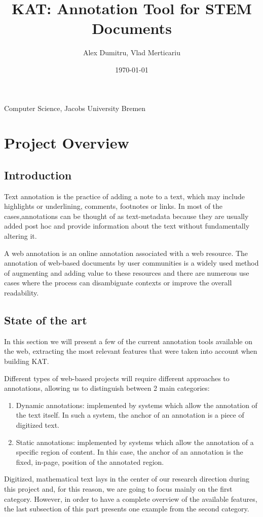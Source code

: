 \documentclass[a4paper, 12pt, notitlepage]{report}
\title{KAT: Annotation Tool for STEM Documents} %
\author{Alex Dumitru, Vlad Merticariu} %
\date{\today} %
\begin{document}
\maketitle
\begin{center}
Computer Science,  Jacobs University Bremen %
\\[12pt]
\end{center}
\thispagestyle{empty}
\newpage

\tableofcontents 



\chapter{Project Overview}
%

\section{Introduction}\label{sec:intro}
Text annotation is the practice of adding a note to a text, which may include highlights
or underlining, comments, footnotes or links.  In most of the cases,annotations can be
thought of as text-metadata because they are usually added post hoc and provide
information about the text without fundamentally altering it.

A web annotation is an online annotation associated with a web resource. The annotation of
web-based documents by user communities is a widely used method of augmenting and adding
value to these resources and there are numerous use cases where the process can
disambiguate contexts or improve the overall readability.
\section{State of the art}
In this section we will present a few of the current annotation tools available on the web, extracting the most relevant features that were taken into account when building KAT.

Different types of web-based projects will 
require different approaches to annotations, allowing us to distinguish between 2 main categories:
\begin{enumerate}
 \item Dynamic annotations: implemented by systems which allow the annotation of the text itself. In such a system, the anchor of an annotation is a piece of digitized text.
 \item Static annotations: implemented by systems which allow the annotation of a specific region of content. In this case, the anchor of an annotation is the fixed, in-page, position of
 the annotated region.
\end{enumerate}
Digitized, mathematical text lays in the center of our research direction during this project and, for this reason, we are going to focus mainly on the first category. However, in order to 
have a complete overview of the available features, the last subsection of this part presents one example from the second category.
\end{document}
